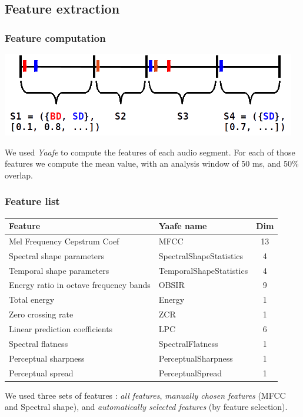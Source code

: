 \documentclass{beamer}
\begin{document}
    \subsection{Feature extraction}
    \begin{frame}
        \frametitle{Feature computation}
        \begin{center}
            \includegraphics[scale=0.7]{segmentation.png}
        \end{center}
        We used \emph{Yaafe} to compute the features of each audio segment. For each of those features we compute the mean value, with an analysis window of 50 ms, and 50\% overlap.
    \end{frame}
    \begin{frame}
        \frametitle{Feature list}
        \footnotesize 
        \begin{center}
        \begin{tabular}{|l|l|c|}
\hline
Feature&Yaafe name&Dim\\
\hline
Mel Frequency Cepstrum Coef&MFCC&13\\
\hline
Spectral shape parameters&SpectralShapeStatistics&4\\
\hline
Temporal shape parameters&TemporalShapeStatistics&4\\
\hline
Energy ratio in octave frequency bands&OBSIR&9\\
\hline
Total energy&Energy&1\\
\hline
Zero crossing rate&ZCR&1\\
\hline
Linear prediction coefficients&LPC&6\\
\hline
Spectral flatness&SpectralFlatness&1\\
\hline
Perceptual sharpness&PerceptualSharpness&1\\
\hline
Perceptual spread&PerceptualSpread&1\\
\hline
\end{tabular}
\end{center}
        \normalsize
        We used three sets of features : \emph{all features}, \emph{manually chosen features} (MFCC and Spectral shape), and \emph{automatically selected features} (by feature selection).
    \end{frame}
\end{document}
